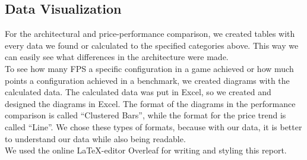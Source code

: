 \subsection{Data Visualization}

For the architectural and price-performance comparison, we created tables with every data we found or calculated to the specified categories above. This way we can easily see what differences in the architecture were made.
\\
To see how many FPS a specific configuration in a game achieved or how much points a configuration achieved in a benchmark, we created diagrams with the calculated data. The calculated data was put in Excel, so we created and designed the diagrams in Excel. The format of the diagrams in the performance comparison is called “Clustered Bars”, while the format for the price trend is called “Line”. We chose these types of formats, because with our data, it is better to understand our data while also being readable.
\\
We used the online \LaTeX -editor Overleaf for writing and styling this report.